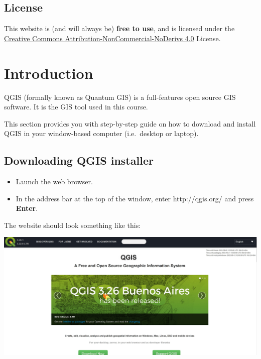 \documentclass[
  letterpaper,
  DIV=11,
  numbers=noendperiod]{scrreprt}
\begin{document}
\hypertarget{license}{%
\section*{License}\label{license}}

This website is (and will always be) \textbf{free to use}, and is
licensed under the
\href{https://creativecommons.org/licenses/by-nc-nd/4.0/}{Creative
Commons Attribution-NonCommercial-NoDerivs 4.0} License.


\hypertarget{introduction}{%
\chapter{Introduction}\label{introduction}}

QGIS (formally known as Quantum GIS) is a full-features open source GIS
software. It is the GIS tool used in this course.

This section provides you with step-by-step guide on how to download and
install QGIS in your window-based computer (i.e.~desktop or laptop).

\hypertarget{downloading-qgis-installer}{%
\section{Downloading QGIS installer}\label{downloading-qgis-installer}}

\begin{itemize}
\item
  Launch the web browser.
\item
  In the address bar at the top of the window, enter http://qgis.org/
  and press \textbf{Enter}.
\end{itemize}

The website should look something like this:

\includegraphics{./img/image1.jpg}
\end{document}
